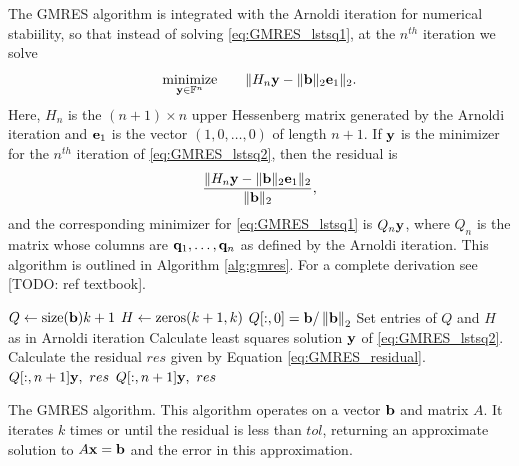 The GMRES algorithm is integrated with the Arnoldi iteration for numerical stabiility, so that instead of solving \eqref{eq:GMRES_lstsq1}, at the $n^{th}$ iteration we solve
\begin{equation}
\underset{{\bf y} \in \mathbb{F}^n}{\text{minimize}}\qquad \|H_n {\bf y} - \|{\bf b}\|_2{\bf e}_1\|_2.
\label{eq:GMRES_lstsq2}
\end{equation}
Here, $H_n$ is the $(n+1)\times n$ upper Hessenberg matrix generated by the Arnoldi iteration and ${\bf e}_1$ is the vector $(1, 0, \ldots, 0)$ of length $n+1$.
If ${\bf y}$ is the minimizer for the $n^{th}$ iteration of \eqref{eq:GMRES_lstsq2}, then the residual is
\begin{equation}
\frac{\|H_n {\bf y} - \|{\bf b}\|_2{\bf e}_1\|_2}{\|{\bf b}\|_2},
\label{eq:GMRES_residual}
\end{equation}
and the corresponding minimizer for \eqref{eq:GMRES_lstsq1} is $Q_n{\bf y}$, where $Q_n$ is the matrix whose columns are ${\bf q}_1, \ldots, {\bf q}_n$ as defined by the Arnoldi iteration.
This algorithm is outlined in Algorithm \ref{alg:gmres}.
For a complete derivation see [TODO: ref textbook].

\begin{algorithm}
\begin{algorithmic}[1]
	\State $Q \gets \empty{\size{\b}}{k+1}$			
	\State $H \gets \zeros{k+1}{ k}$
	\State $Q[:,0] = {\bf b}/\left\lVert{\bf b}\right\rVert_2$
        \State Set entries of $Q$ and $H$ as in Arnoldi iteration
        \State Calculate least squares solution ${\bf y}$ of \ref{eq:GMRES_lstsq2}.
        \State Calculate the residual $res$ given by Equation \ref{eq:GMRES_residual}.
            \State {} $Q[:,n+1]{\bf y}, \,\, res$
        \EndIf
    \EndFor
    \State {} $Q[:,n+1]{\bf y}, \,\, res$						
\EndProcedure
\end{algorithmic}
\caption{The GMRES algorithm. This algorithm operates on a vector ${\bf b}$ and matrix $A$. 
It iterates $k$ times or until the residual is less than $tol$, returning an approximate solution to $A{\bf x}={\bf b}$ and the error in this approximation.}
\label{alg:gmres}
\end{algorithm}



